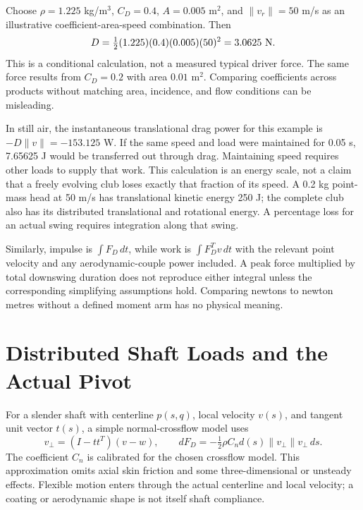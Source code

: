 Choose $\rho=1.225$ kg/m$^3$, $C_D=0.4$, $A=0.005$ m$^2$, and
$\|v_r\|=50$ m/s as an illustrative coefficient-area-speed combination. Then
\begin{equation}
 D=\tfrac12(1.225)(0.4)(0.005)(50)^2=3.0625\ {\rm N}.
 \label{eq:drag-example}
\end{equation}
This is a conditional calculation, not a measured typical driver force. The
same force results from $C_D=0.2$ with area $0.01$ m$^2$. Comparing coefficients
across products without matching area, incidence, and flow conditions can be
misleading.

In still air, the instantaneous translational drag power for this example is
$-D\|v\|=-153.125$ W. If the same speed and load were maintained for 0.05 s,
7.65625 J would be transferred out through drag. Maintaining speed requires
other loads to supply that work. This calculation is an energy scale, not a
claim that a freely evolving club loses exactly that fraction of its speed.
A 0.2 kg point-mass head at 50 m/s has translational kinetic energy 250 J;
the complete club also has its distributed translational and rotational energy.
A percentage loss for an actual swing requires integration along that swing.

Similarly, impulse is $\int F_D\,dt$, while work is $\int F_D^Tv\,dt$ with
the relevant point velocity and any aerodynamic-couple power included. A peak
force multiplied by total downswing duration does not reproduce either integral
unless the corresponding simplifying assumptions hold. Comparing newtons to
newton metres without a defined moment arm has no physical meaning.

\section{Distributed Shaft Loads and the Actual Pivot}

For a slender shaft with centerline $p(s,q)$, local velocity $v(s)$, and tangent
unit vector $t(s)$, a simple normal-crossflow model uses
\begin{equation}
 v_\perp=(I-tt^T)(v-w),\qquad
 dF_D=-\tfrac12\rho C_n d(s)\|v_\perp\|v_\perp\,ds.
 \label{eq:shaft-drag-element}
\end{equation}
The coefficient $C_n$ is calibrated for the chosen crossflow model. This
approximation omits axial skin friction and some three-dimensional or unsteady
effects. Flexible motion enters through the actual centerline and local
velocity; a coating or aerodynamic shape is not itself shaft compliance.

